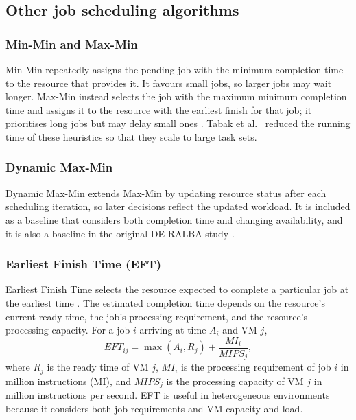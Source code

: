 \documentclass[default,sn-mathphys,Numbered]{sn-jnl}
\begin{document}
\subsection{Other job scheduling algorithms}
\subsubsection{Min-Min and Max-Min}
Min-Min repeatedly assigns the pending job with the minimum completion time to the resource that provides it. It favours small jobs, so larger jobs may wait longer. Max-Min instead selects the job with the maximum minimum completion time and assigns it to the resource with the earliest finish for that job; it prioritises long jobs but may delay small ones \cite{braun2001comparison, elzeki2012improved}. Tabak et al.\ \cite{tabak2014improving} reduced the running time of these heuristics so that they scale to large task sets.

\subsubsection{Dynamic Max-Min}
Dynamic Max-Min \cite{mao2014maxmin} extends Max-Min by updating resource status after each scheduling iteration, so later decisions reflect the updated workload. It is included as a baseline that considers both completion time and changing availability, and it is also a baseline in the original DE-RALBA study \cite{hussain2025deralba}.

\subsubsection{Earliest Finish Time (EFT)}
Earliest Finish Time selects the resource expected to complete a particular job at the earliest time \cite{topcuoglu2002performance}. The estimated completion time depends on the resource's current ready time, the job's processing requirement, and the resource's processing capacity. For a job $i$ arriving at time $A_i$ and VM $j$,
\begin{equation}\label{eq:eftbase}
\mathit{EFT}_{ij} = \max(A_i, R_j) + \frac{\mathit{MI}_i}{\mathit{MIPS}_j},
\end{equation}
where $R_j$ is the ready time of VM $j$, $\mathit{MI}_i$ is the processing requirement of job $i$ in million instructions (MI), and $\mathit{MIPS}_j$ is the processing capacity of VM $j$ in million instructions per second. EFT is useful in heterogeneous environments because it considers both job requirements and VM capacity and load.
\end{document}
